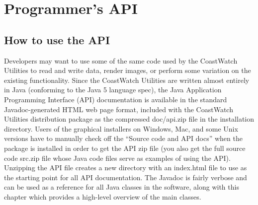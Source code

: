 \chapter{Programmer's API}
\label{api}

\section{How to use the API}

Developers may want to use some of the same code used by the
CoastWatch Utilities to read and write data, render images, or
perform some variation on the existing functionality.  Since the
CoastWatch Utilities are written almost entirely in Java
(conforming to the Java 5 language spec), the Java Application
Programming Interface (API) documentation is available in the
standard Javadoc-generated HTML web page format, included with the
CoastWatch Utilities distribution package as the compressed
{\file doc/api.zip} file in the installation directory.  Users of
the graphical installers on Windows, Mac, and some Unix versions
have to manually check off the ``Source code and API docs'' when
the package is installed in order to get the API zip file (you
also get the full source code {\file src.zip} file whose Java code
files serve as examples of using the API).  Unzipping the API
file creates a new directory with an {\file index.html} file to
use as the starting point for all API documentation.  The Javadoc
is fairly verbose and can be used as a reference for all Java
classes in the software, along with this chapter which provides a
high-level overview of the main classes.

